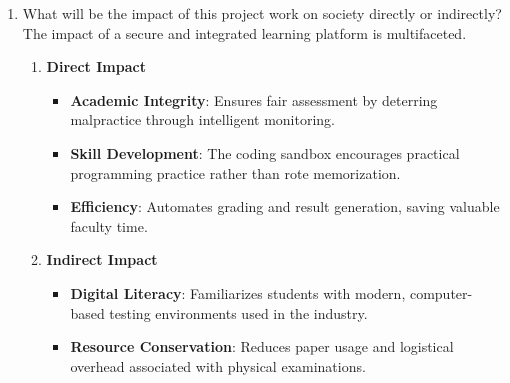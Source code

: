 \documentclass[14pt]{article}
\begin{document}
\begin{enumerate}
\item What will be the impact of this project work on society directly or indirectly?\\
\tabto{.5cm}The impact of a secure and integrated learning platform is multifaceted.
\begin{enumerate}
\item \textbf{Direct Impact}
\begin{itemize}
\item \textbf{Academic Integrity}: Ensures fair assessment by deterring malpractice through intelligent monitoring.
\item \textbf{Skill Development}: The coding sandbox encourages practical programming practice rather than rote memorization.
\item \textbf{Efficiency}: Automates grading and result generation, saving valuable faculty time.
\end{itemize}
\item \textbf{Indirect Impact}
\begin{itemize}
\item \textbf{Digital Literacy}: Familiarizes students with modern, computer-based testing environments used in the industry.
\item \textbf{Resource Conservation}: Reduces paper usage and logistical overhead associated with physical examinations.
\end{itemize}
\end{enumerate}


\end{enumerate}
\end{document}
